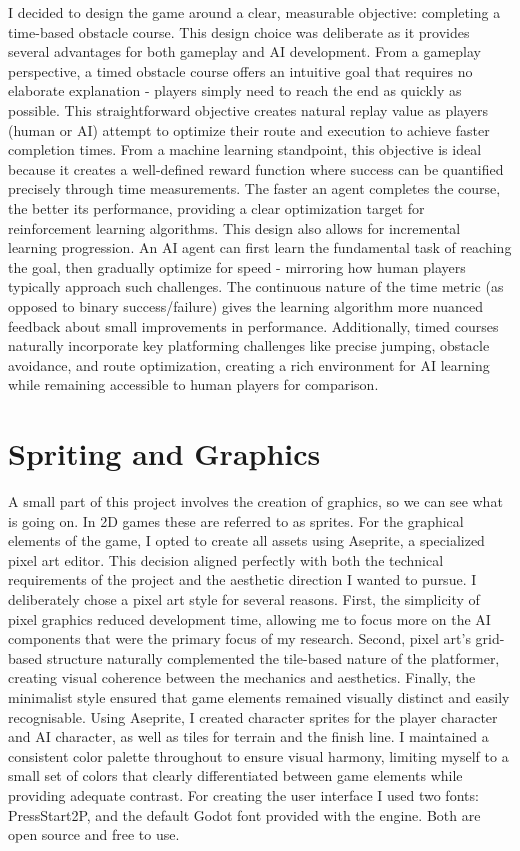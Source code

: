 I decided to design the game around a clear, measurable objective: completing a time-based obstacle course. This design choice was deliberate as it provides several advantages for both gameplay and AI development.
From a gameplay perspective, a timed obstacle course offers an intuitive goal that requires no elaborate explanation - players simply need to reach the end as quickly as possible. 
This straightforward objective creates natural replay value as players (human or AI) attempt to optimize their route and execution to achieve faster completion times.
From a machine learning standpoint, this objective is ideal because it creates a well-defined reward function where success can be quantified precisely through time measurements. 
The faster an agent completes the course, the better its performance, providing a clear optimization target for reinforcement learning algorithms.
This design also allows for incremental learning progression. An AI agent can first learn the fundamental task of reaching the goal, then gradually optimize for speed - mirroring how human players typically approach such challenges. 
The continuous nature of the time metric (as opposed to binary success/failure) gives the learning algorithm more nuanced feedback about small improvements in performance.
Additionally, timed courses naturally incorporate key platforming challenges like precise jumping, obstacle avoidance, and route optimization, creating a rich environment for AI learning while remaining accessible to human players for comparison.

\section{Spriting and Graphics}
A small part of this project involves the creation of graphics, so we can see what is going on. In 2D games these are referred to as sprites.
For the graphical elements of the game, I opted to create all assets using Aseprite, a specialized pixel art editor. This decision aligned perfectly with both the technical requirements of the project and the aesthetic direction I wanted to pursue.
I deliberately chose a pixel art style for several reasons. 
First, the simplicity of pixel graphics reduced development time, allowing me to focus more on the AI components that were the primary focus of my research. 
Second, pixel art's grid-based structure naturally complemented the tile-based nature of the platformer, creating visual coherence between the mechanics and aesthetics. 
Finally, the minimalist style ensured that game elements remained visually distinct and easily recognisable.
Using Aseprite, I created character sprites for the player character and AI character, as well as tiles for terrain and the finish line.
I maintained a consistent color palette throughout to ensure visual harmony, limiting myself to a small set of colors that clearly differentiated between game elements while providing adequate contrast.
For creating the user interface I used two fonts: PressStart2P, and the default Godot font provided with the engine. Both are open source and free to use.